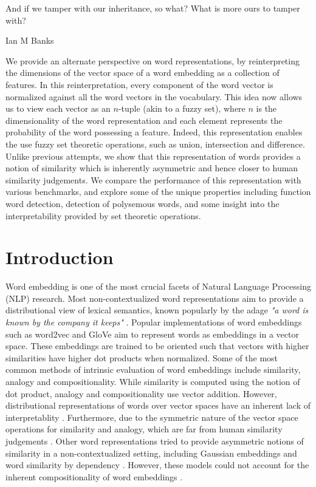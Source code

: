 \documentclass[11pt]{book}
\newcommand{\citep}[1]{\cite{#1}}
\begin{document}
\epigraph{And if we tamper with our inheritance, so what? What is more ours to tamper with?}{Ian M Banks}

We provide an alternate perspective on word representations, by
reinterpreting the dimensions of the vector space of a word embedding as a
collection of features. In this reinterpretation, every component of the word
vector is normalized against all the word vectors in the vocabulary. This idea
now allows us to view each vector as an $n$-tuple (akin to a fuzzy set), where
$n$ is the dimensionality of the word representation and each element
represents the probability of the word possessing a feature. Indeed, this
representation enables the use fuzzy set theoretic operations, such as union,
intersection and difference. Unlike previous attempts, we show that this
representation of words provides a notion of similarity which is inherently
asymmetric and hence closer to human similarity judgements. We compare the
performance of this representation with various benchmarks, and explore some of
the unique properties including function word detection, detection of
polysemous words, and some insight into the interpretability provided by set
theoretic operations.

\section{Introduction} \label{sec: intro}

Word embedding is one of the most crucial facets of Natural Language Processing
(NLP) research. Most non-contextualized word representations aim to provide a
distributional view of lexical semantics, known popularly by the adage
\textit{"a word is known by the company it keeps"} \citep{firth1957synopsis}.
Popular implementations of word embeddings such as word2vec
\citep{mikolov2013efficient} and GloVe \citep{pennington2014glove} aim to
represent words as embeddings in a vector space. These embeddings are trained
to be oriented such that vectors with higher similarities have higher dot
products when normalized. Some of the most common methods of intrinsic
evaluation of word embeddings include similarity, analogy and compositionality.
While similarity is computed using the notion of dot product, analogy and
compositionality use vector addition.
However, distributional representations of words over vector spaces have an
inherent lack of interpretablity \citep{goldberg2014word2vec}. Furthermore, due
to the symmetric nature of the vector space operations for similarity and
analogy, which are far from human similarity judgements
\citep{tversky1977features}. Other word representations tried to provide
asymmetric notions of similarity in a non-contextualized setting, including
Gaussian embeddings \citep{vilnis2014word} and word similarity by dependency
\citep{gawron2014improving}. However, these models could not account for the
inherent compositionality of word embeddings \citep{mikolov2013distributed}.
\end{document}
